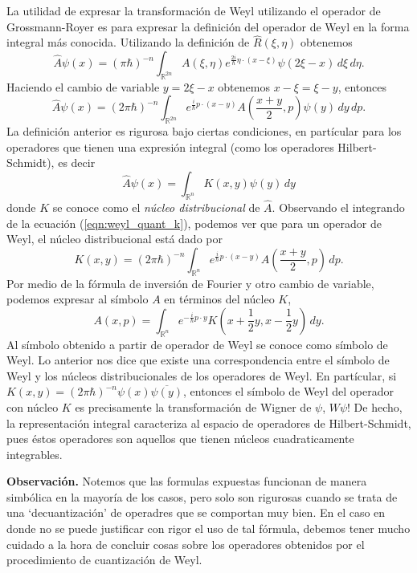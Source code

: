 \documentclass[a4paper]{report}
\DeclareMathOperator{\R}{\mathbb{R}}
\begin{document}
  La utilidad de expresar la transformación de Weyl
  utilizando el operador de Grossmann-Royer es para expresar
  la definición del operador de Weyl en la forma integral
  más conocida. Utilizando la definición de
  $\hat{R}(\xi,\eta)$ obtenemos
  \[
    \hat{A}\psi(x)
    = (\pi\hbar)^{-n} \int_{\R^{2n}} A(\xi,\eta)
    e^{\frac{2i}{\hbar} \eta \cdot (x - \xi)} \psi(2\xi - x)
    \, d\xi \, d\eta.
  \] 
  Haciendo el cambio de variable $y = 2\xi - x$ obtenemos $x
  - \xi = \xi - y$, entonces
  \begin{equation}
    \label{eqn:weyl_quant_k}
    \hat{A}\psi(x)
    = (2\pi\hbar)^{-n} \int_{\R^{2n}} e^{\frac{i}{\hbar} p
    \cdot (x - y)} A\left( \frac{x+y}{2}, p \right) \psi(y)
    \, dy \, dp.
  \end{equation}
  La definición anterior es rigurosa bajo ciertas
  condiciones, en partícular para los operadores que tienen
  una expresión integral (como los operadores
  Hilbert-Schmidt), es decir
  \[
    \hat{A}\psi(x) = \int_{\R^{n}} K(x,y) \psi(y) \, dy
  \] 
  donde $K$ se conoce como el \textit{núcleo distribucional}
  de $\hat{A}$. Observando el integrando de la ecuación
  (\ref{eqn:weyl_quant_k}), podemos ver que para un operador
  de Weyl, el núcleo distribucional está dado por
  \begin{equation}
    K(x,y)
    = (2\pi\hbar)^{-n} \int_{\R^{n}} e^{\frac{i}{\hbar} p
    \cdot (x - y)}A\left( \frac{x+y}{2}, p \right) \, dp.
  \end{equation}
  Por medio de la fórmula de inversión de Fourier y otro
  cambio de variable, podemos expresar al símbolo $A$ en
  términos del núcleo $K$,
  \begin{equation}
    A(x,p)
    = \int_{\R^{n}} e^{-\frac{i}{\hbar} p \cdot y} K\left( x
    + \frac{1}{2}y, x - \frac{1}{2}y\right) \, dy.
  \end{equation}
  Al símbolo obtenido a partir de operador de Weyl se conoce
  como símbolo de Weyl.  Lo anterior nos dice que existe una
  correspondencia entre el símbolo de Weyl y los núcleos
  distribucionales de los operadores de Weyl. En partícular,
  si $K(x,y) = (2\pi\hbar)^{-n} \psi(x)\overline{\psi(y)}$,
  entonces el símbolo de Weyl del operador con núcleo $K$ es
  precisamente la transformación de Wigner de $\psi$,
  $W\psi$! De hecho, la representación integral caracteriza
  al espacio de operadores de Hilbert-Schmidt, pues éstos
  operadores son aquellos que tienen núcleos cuadraticamente
  integrables.

  \textbf{Observación.} Notemos que las formulas expuestas
  funcionan de manera simbólica en la mayoría de los casos,
  pero solo son rigurosas cuando se trata de una
  `decuantización' de operadres que se comportan muy bien.
  En el caso en donde no se puede justificar con rigor el
  uso de tal fórmula, debemos tener mucho cuidado a la hora
  de concluir cosas sobre los operadores obtenidos por el
  procedimiento de cuantización de Weyl.
  
\end{document}
